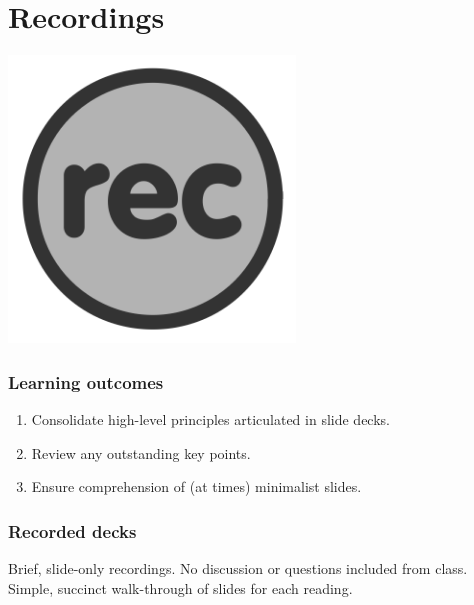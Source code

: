 \documentclass[
]{book}
\providecommand{\tightlist}{%
  \setlength{\itemsep}{0pt}\setlength{\parskip}{0pt}}
\begin{document}
\hypertarget{recordings}{%
\chapter{Recordings}\label{recordings}}

\includegraphics[width=3in,height=\textheight]{./rec.png}

\hypertarget{learning-outcomes-4}{%
\subsection*{Learning outcomes}\label{learning-outcomes-4}}

\begin{enumerate}
\def\labelenumi{\arabic{enumi}.}
\tightlist
\item
  Consolidate high-level principles articulated in slide decks.\\
\item
  Review any outstanding key points.\\
\item
  Ensure comprehension of (at times) minimalist slides.
\end{enumerate}

\hypertarget{recorded-decks}{%
\subsection*{Recorded decks}\label{recorded-decks}}

Brief, slide-only recordings. No discussion or questions included from class. Simple, succinct walk-through of slides for each reading.
\end{document}
